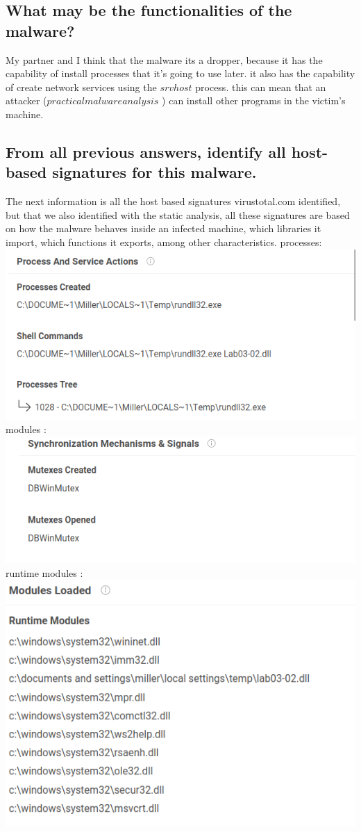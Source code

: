 \documentclass[12pt,letter]{article} %
\begin{document}
        \subsection{What may be the functionalities of the malware?}
            My partner and I think that the malware its a dropper, because it
            has the capability of install processes that it's going to use
            later. it also has the capability of create network services using
            the $ srvhost  $  process. this can mean that an attacker ($
            practicalmalwareanalysis  $ ) can install other programs in the
            victim's machine.

        \subsection{From all previous answers, identify all host-based signatures for this malware.}
        The next information is all the host based signatures virustotal.com identified, but that we also identified with the static analysis, all these signatures are based on how the malware behaves inside an infected machine, which libraries it import, which functions it exports, among other characteristics.
            processes:
            \\ \includegraphics[width=0.5\linewidth]{procesos.png}
            \\modules :
            \\ \includegraphics[width=0.5\linewidth]{modules.png}
            \\ runtime modules :
            \\ \includegraphics[width=0.8\linewidth]{runtime.png}
            \\
\end{document}
